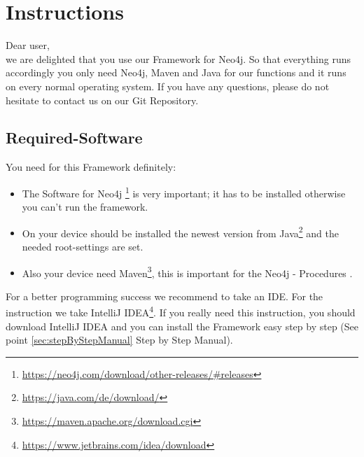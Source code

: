 
\chapter{Instructions}\label{chap:zielbestimmung}
Dear user,\\
we are delighted that you use our Framework for Neo4j. So that everything runs accordingly you only need Neo4j, Maven and Java for our functions and it runs on every normal operating system.
If you have any questions, please do not hesitate to contact us on our \glqq Git Repository\grqq{}.

\section{Required-Software}\label{sec:neededsoftware}
You need for this Framework definitely:
\begin{itemize}
	\item The Software for Neo4j \footnote{\url{https://neo4j.com/download/other-releases/\#releases}} is very important; it has to be installed otherwise you can't run the framework.
	\item On your device should be installed the newest version from Java\footnote{\url{https://java.com/de/download/}} and the needed root-settings are set.
	\item Also your device need Maven\footnote{\url{https://maven.apache.org/download.cgi}}, this is important for the \glqq Neo4j - Procedures \grqq{}.
\end{itemize}
For a better programming success we recommend to take an IDE. For the instruction we take IntelliJ IDEA\footnote{\url{https://www.jetbrains.com/idea/download}}. If you really need this instruction, you should download IntelliJ IDEA and you can install the Framework easy step by step (See point \ref{sec:stepByStepManual} Step by Step Manual).

\newpage

